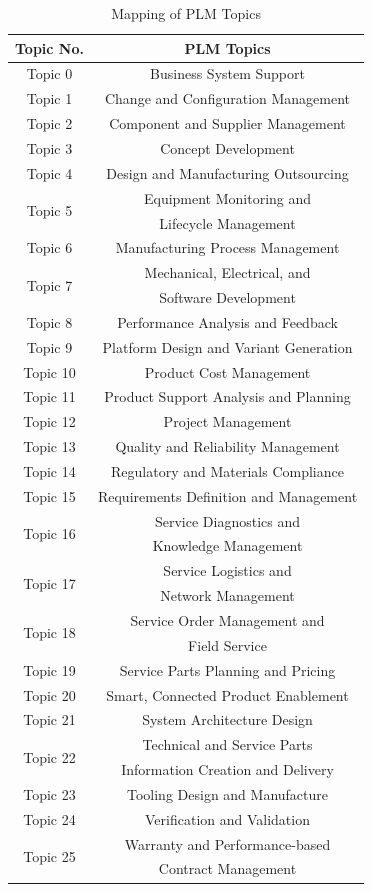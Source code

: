 \documentclass[10pt, conference, compsocconf]{IEEEtran}
\begin{document}
\begin{table}[ht]
\normalsize
\caption{Mapping of PLM Topics}
{\begin{tabular}{|c|c|}
\hline
\textbf{Topic No.}&\textbf{PLM Topics}\\
\hline
Topic 0&Business System Support  \\
\hline
Topic 1&Change and Configuration Management \\
\hline
Topic 2&Component and Supplier Management \\
\hline
Topic 3&Concept Development \\
\hline
Topic 4&Design and Manufacturing Outsourcing \\
\hline
\multirow{2}{*}{Topic 5}&Equipment Monitoring and\\
&Lifecycle Management \\
\hline
Topic 6&Manufacturing Process Management \\
\hline
\multirow{2}{*}{Topic 7}&Mechanical, Electrical, and \\
&Software Development \\
\hline
Topic 8&Performance Analysis and Feedback \\
\hline
Topic 9&Platform Design and Variant Generation \\
\hline
Topic 10&Product Cost Management \\
\hline
Topic 11&Product Support Analysis and Planning \\
\hline
Topic 12&Project Management \\
\hline
Topic 13&Quality and Reliability Management \\
\hline
Topic 14&Regulatory and Materials Compliance \\
\hline
Topic 15&Requirements Definition and Management \\
\hline
\multirow{2}{*}{Topic 16}&Service Diagnostics and \\
&Knowledge Management \\
\hline
\multirow{2}{*}{Topic 17}&Service Logistics and\\
&Network Management \\
\hline
\multirow{2}{*}{Topic 18}&Service Order Management and\\
&Field Service \\
\hline
Topic 19&Service Parts Planning and Pricing \\
\hline
Topic 20&Smart, Connected Product Enablement \\
\hline
Topic 21&System Architecture Design \\
\hline
\multirow{2}{*}{Topic 22}&Technical and Service Parts \\
&Information Creation and Delivery\\
\hline
Topic 23&Tooling Design and Manufacture \\
\hline
Topic 24&Verification and Validation \\
\hline
\multirow{2}{*}{Topic 25}&Warranty and Performance-based \\
&Contract Management\\
\hline
\end{tabular}}
\label{table 5: mapping plm}
\end{table}
\end{document}
